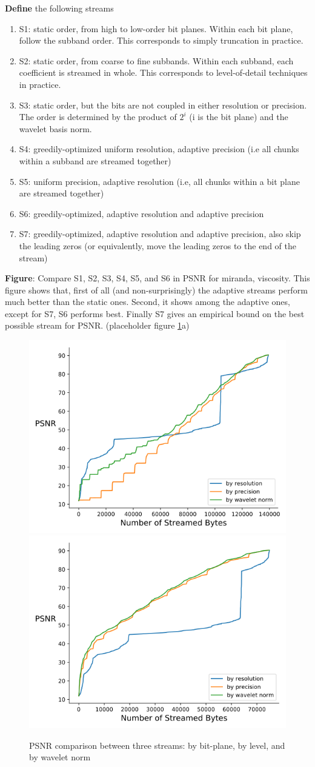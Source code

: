 \textbf{Define} the following streams
\begin{enumerate}
  \item S1: static order, from high to low-order bit planes. Within each bit plane, follow the subband order. This corresponds to simply truncation in practice.
  \item S2: static order, from coarse to fine subbands. Within each subband, each coefficient is streamed in whole. This corresponds to level-of-detail techniques in practice.
  \item S3: static order, but the bits are not coupled in either resolution or precision. The order is determined by the product of $2^i$ (i is the bit plane) and the wavelet basis norm.
  \item S4: greedily-optimized uniform resolution, adaptive precision (i.e all chunks within a subband are streamed together)
  \item S5: uniform precision, adaptive resolution (i.e, all chunks within a bit plane are streamed together)
  \item S6: greedily-optimized, adaptive resolution and adaptive precision 
  \item S7: greedily-optimized, adaptive resolution and adaptive precision, also skip the leading zeros (or equivalently, move the leading zeros to the end of the stream)
\end{enumerate}

\textbf{Figure}: Compare S1, S2, S3, S4, S5, and S6 in PSNR for miranda, viscosity. This figure shows that, first of all (and non-surprisingly) the adaptive streams perform much better than the static ones. Second, it shows among the adaptive ones, except for S7, S6 performs best. Finally S7 gives an empirical bound on the best possible stream for PSNR. (placeholder figure \ref{fig:psnr_traditional_vs_by_norm_viscosity}a)

\begin{figure}[t]
	\centering
	{\includegraphics[width=0.4\linewidth]{resources/rmse-miranda-viscosity.png}}
	{\includegraphics[width=0.4\linewidth]{resources/rmse-miranda-viscosity_slz.png}}
	\caption {PSNR comparison between three streams: by bit-plane, by level, and by wavelet norm}
	\label{fig:psnr_traditional_vs_by_norm_viscosity}
\end{figure}

